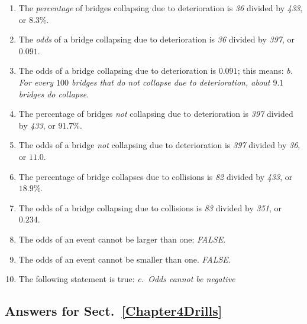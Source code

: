 \documentclass[
  11pt,
  a4paper,
  krantz2]{krantz}
\providecommand{\tightlist}{%
  \setlength{\itemsep}{0pt}\setlength{\parskip}{0pt}}
\begin{document}
\begin{footnotesize}
\begin{enumerate}
\def\labelenumi{\arabic{enumi}.}
\tightlist
\item
  The \emph{percentage} of bridges collapsing due to deterioration is \emph{36} divided by \emph{433}, or \(8.3\)\%.
\item
  The \emph{odds} of a bridge collapsing due to deterioration is \emph{36} divided by \emph{397}, or \(0.091\).
\item
  The odds of a bridge collapsing due to deterioration is \(0.091\); this means: \emph{b. For every \(100\) bridges that do not collapse due to deterioration, about \(9.1\) bridges do collapse}.
\item
  The percentage of bridges \emph{not} collapsing due to deterioration is \emph{397} divided by \emph{433}, or \(91.7\)\%.
\item
  The odds of a bridge \emph{not} collapsing due to deterioration is \emph{397} divided by \emph{36}, or \(11.0\).
\item
  The percentage of bridge collapses due to collisions is \emph{82} divided by \emph{433}, or \(18.9\)\%.
\item
  The odds of a bridge collapsing due to collisions is \emph{83} divided by \emph{351}, or \(0.234\).
\item
  The odds of an event cannot be larger than one: \emph{FALSE}.
\item
  The odds of an event cannot be smaller than one. \emph{FALSE}.
\item
  The following statement is true: \emph{c.~Odds cannot be negative}
\end{enumerate}

\subsection*{Answers for Sect.~\ref{Chapter4Drills}}\label{answers-for-sect.-refchapter4drills}


\end{footnotesize}
\end{document}
